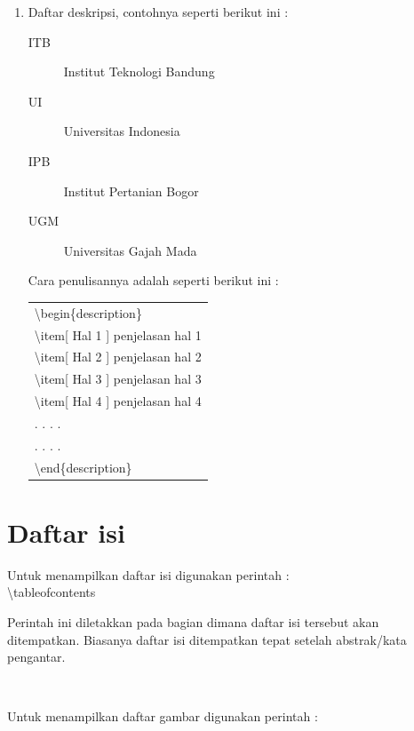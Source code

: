 \begin{enumerate}
\begin{tabular}{|p{12.5 cm}|}
\hline
\end{tabular}
\item Daftar deskripsi, contohnya seperti berikut ini :
\begin{description}
\item[ITB]Institut Teknologi Bandung
\item[UI]Universitas Indonesia
\item[IPB]Institut Pertanian Bogor
\item[UGM]Universitas Gajah Mada
\end{description}
Cara penulisannya adalah seperti berikut ini :\\[0.5 cm]
\begin{tabular}{|p{12.5 cm}|}
\hline
\textbackslash begin\{description\}\\
\textbackslash item[ Hal 1 ] penjelasan hal 1\\
\textbackslash item[ Hal 2 ] penjelasan hal 2\\
\textbackslash item[ Hal 3 ] penjelasan hal 3\\
\textbackslash item[ Hal 4 ] penjelasan hal 4\\
. . . .\\
. . . .\\
\textbackslash end\{description\}\\

\hline
\end{tabular}
\end{enumerate}
\section{Daftar isi}
Untuk menampilkan daftar isi digunakan perintah :\\[0.5 cm]

\textbackslash tableofcontents\\[0.5 cm]


\begin{raggedleft}Perintah ini diletakkan pada bagian dimana daftar isi tersebut akan ditempatkan. Biasanya daftar isi ditempatkan tepat setelah abstrak/kata pengantar.\end{raggedleft}\\[0.5 cm]


\begin{raggedleft} Untuk menampilkan daftar gambar digunakan perintah :\end{raggedleft}\\[0.5 cm]



